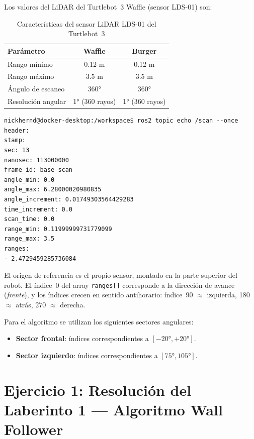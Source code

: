 Los valores del LiDAR del Turtlebot~3 Waffle (sensor LDS-01) son:

\begin{table}[H]
\centering
\begin{tabular}{lcc}
\toprule
\textbf{Parámetro}     & \textbf{Waffle}  & \textbf{Burger}  \\
\midrule
Rango mínimo           & 0.12 m           & 0.12 m           \\
Rango máximo           & 3.5 m            & 3.5 m            \\
Ángulo de escaneo      & 360°             & 360°             \\
Resolución angular     & 1°  (360 rayos)  & 1° (360 rayos)   \\
\bottomrule
\end{tabular}
\caption{Características del sensor LiDAR LDS-01 del Turtlebot~3}
\end{table}

\begin{lstlisting}
nickhernd@docker-desktop:/workspace$ ros2 topic echo /scan --once
header:
stamp:
sec: 13
nanosec: 113000000
frame_id: base_scan
angle_min: 0.0
angle_max: 6.28000020980835
angle_increment: 0.01749303564429283
time_increment: 0.0
scan_time: 0.0
range_min: 0.11999999731779099
range_max: 3.5
ranges:
- 2.4729459285736084
\end{lstlisting}

El origen de referencia es el propio sensor, montado en la parte superior del robot.
El índice~0 del array \texttt{ranges[]} corresponde a la dirección de avance
(\textit{frente}), y los índices crecen en sentido antihorario:
índice~90 $\approx$ izquierda, 180 $\approx$ atrás, 270 $\approx$ derecha.

Para el algoritmo se utilizan los siguientes sectores angulares:
\begin{itemize}
  \item \textbf{Sector frontal}: índices correspondientes a $[-20°, +20°]$.
  \item \textbf{Sector izquierdo}: índices correspondientes a $[75°, 105°]$.
\end{itemize}

\section{Ejercicio 1: Resolución del Laberinto 1 --- Algoritmo Wall Follower}


